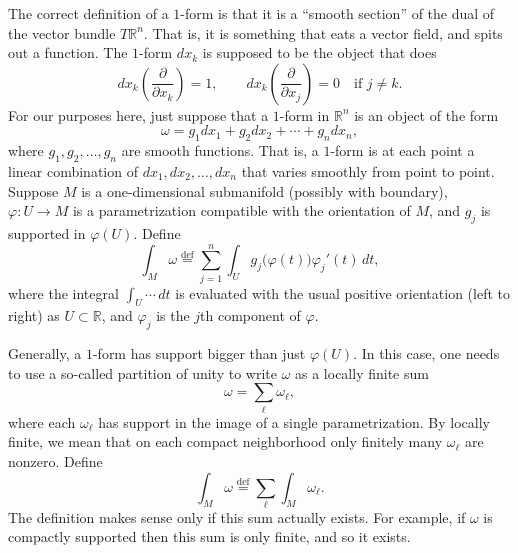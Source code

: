 \documentclass[12pt,openany]{book}
\newcommand{\R}{{\mathbb{R}}}
\theoremstyle{plain}
\theoremstyle{remark}
\theoremstyle{definition}
\theoremstyle{exercise}
\theoremstyle{example}
\begin{document}
The correct definition of a $1$-form is that it is a ``smooth section'' of
the dual of the vector bundle $T \R^n$.  That is, it is something that eats
a vector field, and spits out a function.  The $1$-form
$dx_k$ is supposed to be the object that does
\begin{equation*}
dx_k\left(
\frac{\partial}{\partial x_k}
\right)
=
1,
\qquad
dx_k\left(
\frac{\partial}{\partial x_j}
\right)
=
0 \quad \text{if $j\not=k$}.
\end{equation*}
For our purposes here, just suppose that a $1$-form
in $\R^n$ is an object of the form
\begin{equation*}
\omega = g_1 dx_1 + g_2 dx_2 + \cdots + g_n dx_n ,
\end{equation*}
where $g_1, g_2, \ldots, g_n$ are smooth functions.  That is, a $1$-form is
at each point a linear combination of $dx_1, dx_2, \ldots, dx_n$ that
varies smoothly from point to point.
Suppose $M$ is a one-dimensional submanifold
(possibly with boundary), $\varphi \colon U \to M$
is a parametrization compatible with the orientation of $M$,
and $g_j$ is supported in $\varphi(U)$.
Define
\begin{equation*}
\int_M \omega
\overset{\text{def}}{=}
\sum_{j=1}^n
\int_U g_j\bigl( \varphi(t) \bigr) \varphi_j'(t) \, dt ,
\end{equation*}
where the integral $\int_U \cdots \, dt$
is evaluated with the usual positive orientation
(left to right) as $U \subset \R$, and $\varphi_j$ is the $j$th component
of $\varphi$.

Generally, a $1$-form has support bigger than just $\varphi(U)$.  In this
case, one needs to use a so-called partition of unity to write $\omega$
as a locally finite sum
\begin{equation*}
\omega = \sum_{\ell} \omega_\ell ,
\end{equation*}
where each $\omega_\ell$ has support in the image of a single
parametrization.  By locally finite, we mean that on each compact
neighborhood only finitely many $\omega_\ell$ are nonzero.  
Define
\begin{equation*}
\int_M \omega
\overset{\text{def}}{=}
\sum_{\ell}
\int_M \omega_\ell .
\end{equation*}
The definition makes sense only
if this sum actually exists.  For example, if $\omega$ is
compactly supported then this sum is only finite, and so it exists.
\end{document}
